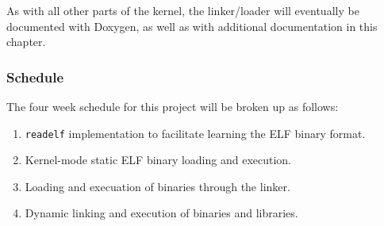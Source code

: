 As with all other parts of the kernel, the linker/loader will eventually
be documented with Doxygen, as well as with additional documentation in this
chapter.

\subsubsection{Schedule}

The four week schedule for this project will be broken up as follows:

\begin{enumerate}
    \item \texttt{readelf} implementation to facilitate learning the ELF binary format.
    \item Kernel-mode static ELF binary loading and execution.
    \item Loading and execuation of binaries through the linker.
    \item Dynamic linking and execution of binaries and libraries.
\end{enumerate}

